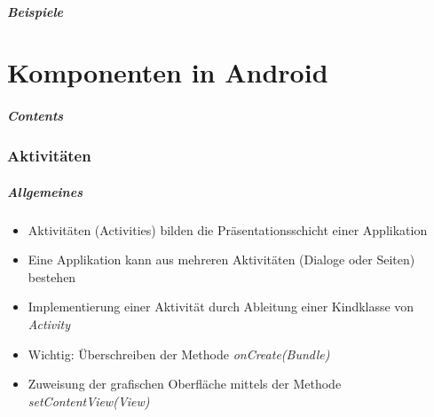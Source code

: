 \begin{frame}[label=resources]
   \frametitle{Beispiele}

   
   
   
\end{frame}

\part{Komponenten in Android}
\frame{\partpage}
\begin{frame}
	\frametitle{Contents}
	\tableofcontents[
		pausesections,
	]
\end{frame}

\section{Aktivitäten}
\begin{frame}[label=activities]
   \frametitle{Allgemeines}
   \begin{itemize}
      \item Aktivitäten (Activities) bilden die Präsentationsschicht einer Applikation
      \item Eine Applikation kann aus mehreren Aktivitäten (Dialoge oder Seiten) bestehen
      \item Implementierung einer Aktivität durch Ableitung einer Kindklasse von \emph{Activity}
      \item Wichtig: Überschreiben der Methode \emph{onCreate(Bundle)}
      \item Zuweisung der grafischen Oberfläche mittels der Methode \emph{setContentView(View)}
   \end{itemize}

   
\end{frame}

